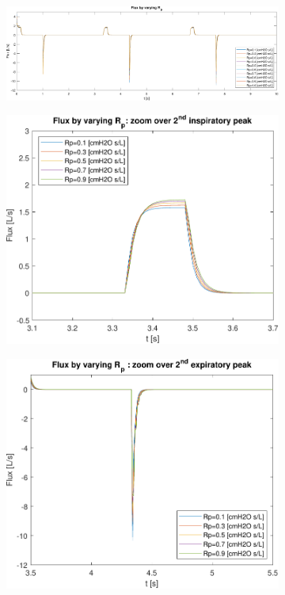 \begin{figure}[t!]
	\begin{subfigure}{\linewidth}
		\centering
		\includegraphics[width=0.95\linewidth]{../model/data_log/Rp_flux_total.pdf}
		\caption{}
	\end{subfigure}\hfill
	\begin{subfigure}{0.5\linewidth}
		\centering
		\includegraphics[width=0.95\linewidth]{../model/data_log/Rp_flux_zoom1.pdf}
		\caption{}
	\end{subfigure}\hfill
	\begin{subfigure}{0.5\linewidth}
		\centering
		\includegraphics[width=0.95\linewidth]{../model/data_log/Rp_flux_zoom2.pdf}

\end{subfigure}
\end{figure}

